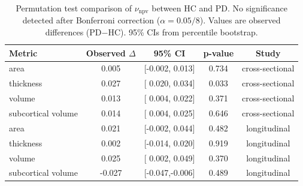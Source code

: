 \begin{table}[H]
    \centering
    \caption{Permutation test comparison of $\nu_{\text{npv}}$ between HC and PD.\@
        No significance detected after Bonferroni correction ($\alpha=0.05/8$).
        Values are observed differences (PD$-$HC). 95\% CIs from percentile bootstrap.\label{tab:bootstrap-npvr}}
    \begin{tabular}{lcccc}
        \toprule
        \textbf{Metric}    & {\textbf{Observed} $\Delta$} & \textbf{95\% CI} & {\textbf{p-value}} & \textbf{Study}  \\
        \midrule
        area               & 0.005                        & [-0.002, 0.013]  & 0.734              & cross-sectional \\
        thickness          & 0.027                        & [ 0.020, 0.034]  & 0.033              & cross-sectional \\
        volume             & 0.013                        & [ 0.004, 0.022]  & 0.371              & cross-sectional \\
        subcortical volume & 0.014                        & [ 0.004, 0.025]  & 0.646              & cross-sectional \\
        \midrule
        area               & 0.021                        & [-0.002, 0.044]  & 0.482              & longitudinal    \\
        thickness          & 0.002                        & [-0.014, 0.020]  & 0.919              & longitudinal    \\
        volume             & 0.025                        & [ 0.002, 0.049]  & 0.370              & longitudinal    \\
        subcortical volume & -0.027                       & [-0.047,-0.006]  & 0.489              & longitudinal    \\
        \bottomrule
    \end{tabular}
\end{table}

